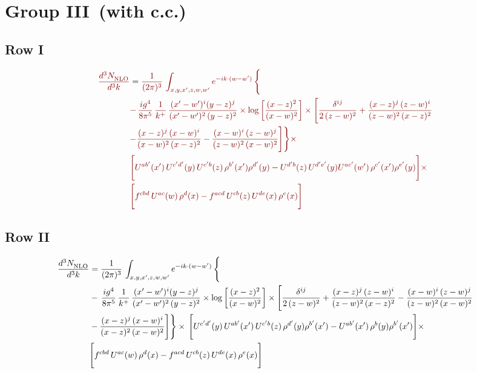 \documentclass[9pt]{article}
\numberwithin{equation}{section}
\begin{document}
\section{Group III\, (with c.c.)}
\subsection{Row I}
\begin{align}
     {\color{red!50!black}\frac{d^{3}N_{\rm NLO}^{\rm}}{d^{3}k}}  & = {\color{red!50!black}\frac{1}{(2\pi)^{3}}\, \int_{x,y,x',z,w,w^{\prime}} e^{-ik\cdot (w-w')}\, \Bigg\{}\notag \\
& {\color{red!50!black}-\,\frac{ig^{4}}{8\pi^{5}}\,\frac{1}{k^{+}}\,\frac{(x'-w')^{i}(y-z)^{j}}{(x'-w')^{2}\,(y-z)^{2}}\times \log{\left[\frac{(x-z)^{2}}{(x-w)^{2}}\right]}\times \Bigg[\frac{\delta^{ij}}{2\,(z-w)^{2}}+\frac{(x-z)^{j}\,(z-w)^{i}}{(z-w)^{2}\,(x-z)^{2}}}\notag \\ & {\color{red!50!black}-\frac{(x-z)^{j}\,(x-w)^{i}}{(x-w)^{2}\,(x-z)^{2}}-\frac{(x-w)^{i}\,(z-w)^{j}}{(z-w)^{2}\,(x-w)^{2}}\Bigg]\Bigg\}\times} \notag \\ &  {\color{red!50!black}\Bigg[U^{ab'}(x')\,U^{c'd'}(y)\,U^{c'b}(z)\,\rho^{b'}(x')\rho^{d'}(y)-U^{d'b}(z)\,U^{d'e'}(y)U^{ac'}(w')\,\rho^{c'}(x')\rho^{e'}(y)\Bigg]\times}\notag \\ & {\color{red!50!black}\Bigg[f^{cbd}\,U^{ac}(w)\,\rho^{d}(x)-f^{acd}\, U^{cb}(z)\,U^{de}(x)\,\rho^{e}(x)\Bigg]}
\end{align}
\subsection{Row II}
\begin{align}
     \frac{d^{3}N_{\rm NLO}^{\rm}}{d^{3}k}  & =   \frac{1}{(2\pi)^{3}}\, \int_{x,y,x',z,w,w^{\prime}} e^{-ik\cdot (w-w')}\, \Bigg\{\notag \\
& -\,\frac{ig^{4}}{8\pi^{5}}\,\frac{1}{k^{+}}\,\frac{(x'-w')^{i}(y-z)^{j}}{(x'-w')^{2}\,(y-z)^{2}}\times \log{\left[\frac{(x-z)^{2}}{(x-w)^{2}}\right]}\times \Bigg[\frac{\delta^{ij}}{2\,(z-w)^{2}}+\frac{(x-z)^{j}\,(z-w)^{i}}{(z-w)^{2}\,(x-z)^{2}} -\frac{(x-w)^{i}\,(z-w)^{j}}{(z-w)^{2}\,(x-w)^{2}}\notag \\ & -\frac{(x-z)^{j}\,(x-w)^{i}}{(x-z)^{2}\,(x-w)^{2}}\Bigg]\Bigg\}\times\,\Bigg[U^{c'd'}(y)\,U^{ab'}(x')\,U^{c'b}(z)\,\rho^{d'}(y)\rho^{b'}(x')-U^{ab'}(x')\,\rho^{b}(y)\rho^{b'}(x')\Bigg]\times\notag \\ & \Bigg[f^{cbd}\,U^{ac}(w)\,\rho^{d}(x)-f^{acd}\, U^{cb}(z)\,U^{de}(x)\,\rho^{e}(x)\Bigg]
\end{align}
\end{document}
